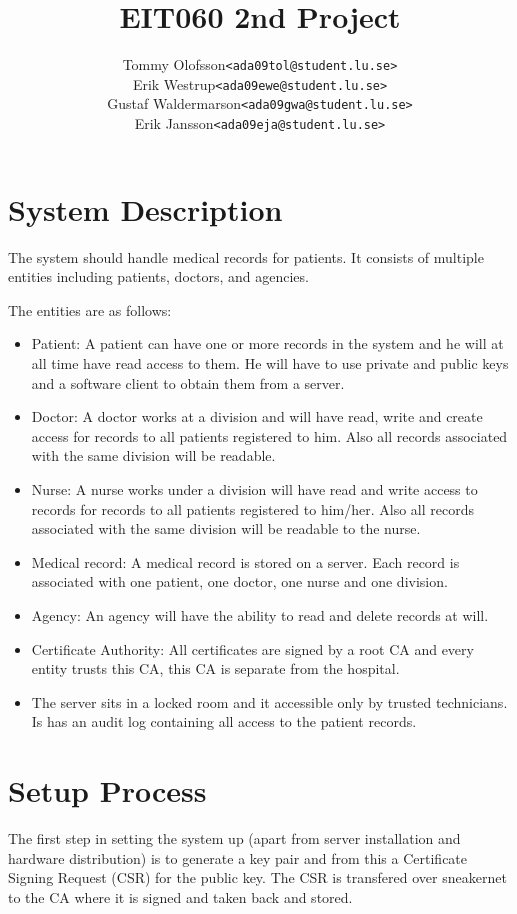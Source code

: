 \documentclass[10pt, a4paper]{article}
\title{EIT060 2nd Project}
\date{}
\author{
	\begin{tabular}{l l}
		Tommy Olofsson & \texttt{<ada09tol@student.lu.se>}\\
		Erik Westrup & \texttt{<ada09ewe@student.lu.se>}\\
		Gustaf Waldermarson & \texttt{<ada09gwa@student.lu.se>}\\
		Erik Jansson & \texttt{<ada09eja@student.lu.se>}
	\end{tabular}
}
\begin{document}
\begin{titlepage}
\maketitle
\begin{center}
\end{center}

\thispagestyle{empty}
\end{titlepage}
\setcounter{page}{2}
\section{System Description}
The system should handle medical records for patients. It consists of multiple entities including patients, doctors, and agencies. %

The entities are as follows:
\begin{itemize}
\item Patient: A patient can have one or more records in the system and he will at all time have read access to them. He will have to use private and public keys and a software client to obtain them from a server. 
\item Doctor: A doctor works at a division and will have read, write and create access for records to all patients registered to him. Also all records associated with the same division will be readable.
\item Nurse: A nurse works under a division will have read and write access to records for records to all patients registered to him/her. Also all records associated with the same division will be readable to the nurse.
\item Medical record: A medical record is stored on a server. Each record is associated with one patient, one doctor, one nurse and one division.
\item Agency: An agency will have the ability to read and delete records at will.
\item Certificate Authority: All certificates are signed by a root CA and every entity trusts this CA, this CA is
separate from the hospital.
\item The server sits in a locked room and it accessible only by trusted technicians. Is has an audit log containing all access to the patient records.
\end{itemize}

\section{Setup Process}
The first step in setting the system up (apart from server installation and hardware distribution) is to generate a key pair and from this a Certificate Signing Request (CSR) for the public key. The CSR is transfered over sneakernet to the CA where it is signed and taken back and stored. 
\end{document}
